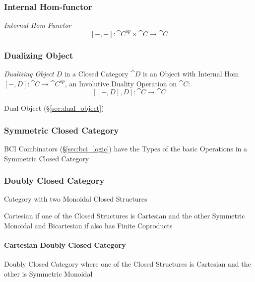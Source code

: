 \subsubsection{Internal Hom-functor}\label{sec:internal_hom}

\emph{Internal Hom Functor}
\[
  [-,-] : \cat{C}^{op} \times \cat{C} \rightarrow \cat{C}
\]



\subsubsection{Dualizing Object}\label{sec:dualizing_object}

\emph{Dualizing Object} $D$ in a Closed Category $\cat{D}$ is an
Object with Internal Hom $[-,D]: \cat{C} \rightarrow \cat{C}^{op}$, an
Involutive Duality Operation on $\cat{C}$: %
\[
  [[-,D],D]: \cat{C} \rightarrow \cat{C}
\]

Dual Object (\S\ref{sec:dual_object})



\subsubsection{Symmetric Closed Category}
\label{sec:symmetric_closed_category}

BCI Combinators (\S\ref{sec:bci_logic}) have the Types of the basic
Operations in a Symmetric Closed Category



\subsubsection{Doubly Closed Category}\label{sec:doubly_closed_category}

Category with two Monoidal Closed Structures

Cartesian if one of the Closed Structures is Cartesian and the other
Symmetric Monoidal and Bicartesian if also has Finite Coproducts



\paragraph{Cartesian Doubly Closed Category}
\label{sec:cartesian_doubly_closed}\hfill

Doubly Closed Category where one of the Closed Structures is Cartesian
and the other is Symmetric Monoidal



